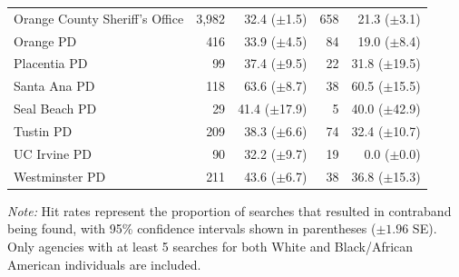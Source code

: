 \begin{table}[H]
\begin{tabular}{l rr rr}
Orange County Sheriff's Office & 3,982 & 32.4 ({\scriptsize $\pm$1.5}) & 658 & 21.3 ({\scriptsize $\pm$3.1}) \\
Orange PD & 416 & 33.9 ({\scriptsize $\pm$4.5}) & 84 & 19.0 ({\scriptsize $\pm$8.4}) \\
Placentia PD & 99 & 37.4 ({\scriptsize $\pm$9.5}) & 22 & 31.8 ({\scriptsize $\pm$19.5}) \\
Santa Ana PD & 118 & 63.6 ({\scriptsize $\pm$8.7}) & 38 & 60.5 ({\scriptsize $\pm$15.5}) \\
Seal Beach PD & 29 & 41.4 ({\scriptsize $\pm$17.9}) & 5 & 40.0 ({\scriptsize $\pm$42.9}) \\
Tustin PD & 209 & 38.3 ({\scriptsize $\pm$6.6}) & 74 & 32.4 ({\scriptsize $\pm$10.7}) \\
UC Irvine PD & 90 & 32.2 ({\scriptsize $\pm$9.7}) & 19 & 0.0 ({\scriptsize $\pm$0.0}) \\
Westminster PD & 211 & 43.6 ({\scriptsize $\pm$6.7}) & 38 & 36.8 ({\scriptsize $\pm$15.3}) \\
\bottomrule
\end{tabular}
\smallskip
\parbox{\textwidth}{\footnotesize \textit{Note:} Hit rates represent the proportion of searches that resulted in contraband being found, with 95\% confidence intervals shown in parentheses ($\pm 1.96$ SE). Only agencies with at least 5 searches for both White and Black/African American individuals are included.}
\end{table}